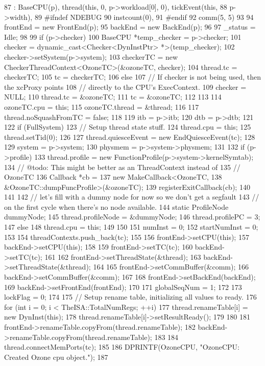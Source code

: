 \begin{DoxyCode}
87     : BaseCPU(p), thread(this, 0, p->workload[0], 0), tickEvent(this,
88             p->width),
89 #ifndef NDEBUG
90       instcount(0),
91 #endif
92       comm(5, 5)
93 {
94     frontEnd = new FrontEnd(p);
95     backEnd = new BackEnd(p);
96 
97     _status = Idle;
98 
99     if (p->checker) {
100         BaseCPU *temp_checker = p->checker;
101         checker = dynamic_cast<Checker<DynInstPtr> *>(temp_checker);
102         checker->setSystem(p->system);
103         checkerTC = new CheckerThreadContext<OzoneTC>(&ozoneTC, checker);
104         thread.tc = checkerTC;
105         tc = checkerTC;
106     } else {
107         // If checker is not being used, then the xcProxy points
108         // directly to the CPU's ExecContext.
109         checker = NULL;
110         thread.tc = &ozoneTC;
111         tc = &ozoneTC;
112     }
113 
114     ozoneTC.cpu = this;
115     ozoneTC.thread = &thread;
116 
117     thread.noSquashFromTC = false;
118 
119     itb = p->itb;
120     dtb = p->dtb;
121 
122     if (FullSystem) {
123         // Setup thread state stuff.
124         thread.cpu = this;
125         thread.setTid(0);
126 
127         thread.quiesceEvent = new EndQuiesceEvent(tc);
128 
129         system = p->system;
130         physmem = p->system->physmem;
131 
132         if (p->profile) {
133             thread.profile = new FunctionProfile(p->system->kernelSymtab);
134             // @todo: This might be better as an ThreadContext instead of
135             // OzoneTC
136             Callback *cb =
137                 new MakeCallback<OzoneTC,
138                 &OzoneTC::dumpFuncProfile>(&ozoneTC);
139             registerExitCallback(cb);
140         }
141 
142         // let's fill with a dummy node for now so we don't get a segfault
143         // on the first cycle when there's no node available.
144         static ProfileNode dummyNode;
145         thread.profileNode = &dummyNode;
146         thread.profilePC = 3;
147     } else {
148         thread.cpu = this;
149     }
150 
151     numInst = 0;
152     startNumInst = 0;
153 
154     threadContexts.push_back(tc);
155 
156     frontEnd->setCPU(this);
157     backEnd->setCPU(this);
158 
159     frontEnd->setTC(tc);
160     backEnd->setTC(tc);
161 
162     frontEnd->setThreadState(&thread);
163     backEnd->setThreadState(&thread);
164 
165     frontEnd->setCommBuffer(&comm);
166     backEnd->setCommBuffer(&comm);
167 
168     frontEnd->setBackEnd(backEnd);
169     backEnd->setFrontEnd(frontEnd);
170 
171     globalSeqNum = 1;
172 
173     lockFlag = 0;
174 
175     // Setup rename table, initializing all values to ready.
176     for (int i = 0; i < TheISA::TotalNumRegs; ++i) {
177         thread.renameTable[i] = new DynInst(this);
178         thread.renameTable[i]->setResultReady();
179     }
180 
181     frontEnd->renameTable.copyFrom(thread.renameTable);
182     backEnd->renameTable.copyFrom(thread.renameTable);
183 
184     thread.connectMemPorts(tc);
185 
186     DPRINTF(OzoneCPU, "OzoneCPU: Created Ozone cpu object.\n");
187 }
\end{DoxyCode}
